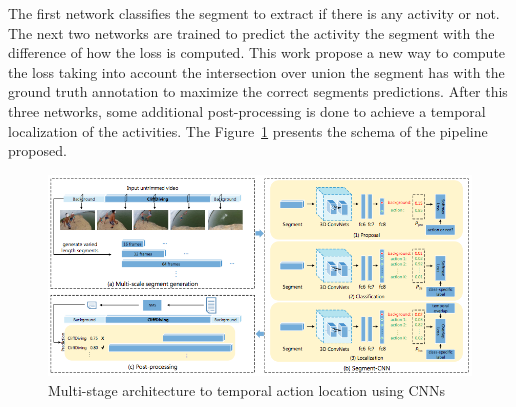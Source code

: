 The first network classifies the segment to extract if there is any activity or not. The next two networks are trained to predict the activity the segment with the difference of how the loss is computed. This work propose a new way to compute the loss taking into account the intersection over union the segment has with the ground truth annotation to maximize the correct segments predictions. After this three networks, some additional post-processing is done to achieve a temporal localization of the activities. The Figure~\ref{fig:multistage} presents the schema of the pipeline proposed.

\begin{figure}[ht]
\begin{center}
\includegraphics[width=0.8\linewidth]{img/stateofart/multistage}
\end{center}
\caption{Multi-stage architecture to temporal action location using CNNs}
\label{fig:multistage}
\end{figure}



